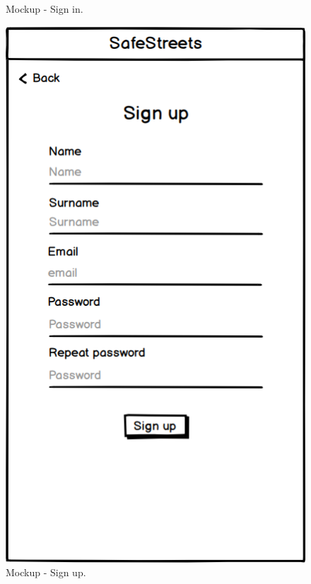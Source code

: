 \begin{@empty}
\begin{figure}[H]
\begin{minipage}{.4\textwidth}
    \caption{\label{fig:mockup-sign-in}Mockup - Sign in.}
\end{minipage}
\begin{minipage}{.4\textwidth}
    \centering
    \includegraphics[width=.8\textwidth]{Images/sign-up.png}
    \caption{\label{fig:mockup-sign-up}Mockup - Sign up.}
\end{minipage}
\end{figure}


\end{@empty}
